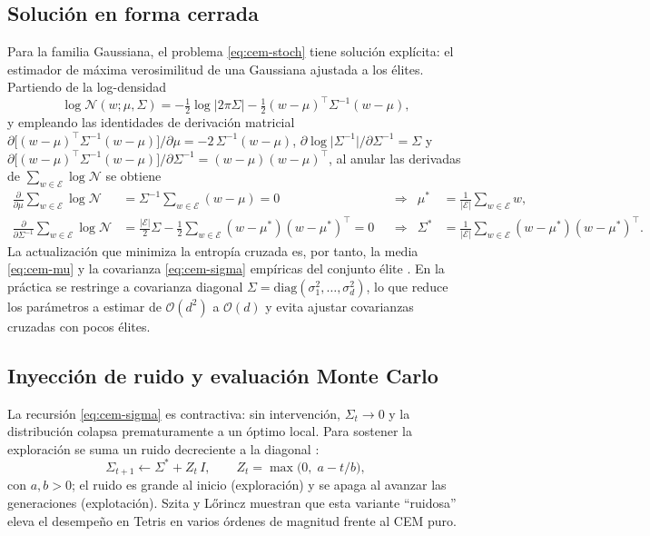 \subsection{Solución en forma cerrada}
Para la familia Gaussiana, el problema \eqref{eq:cem-stoch} tiene solución explícita:
el estimador de máxima verosimilitud de una Gaussiana ajustada a los élites. Partiendo
de la log-densidad
\begin{equation}
  \log \mathcal{N}(w; \mu, \Sigma)
  = -\tfrac{1}{2}\log\lvert 2\pi\Sigma\rvert
    - \tfrac{1}{2}(w-\mu)^{\top}\Sigma^{-1}(w-\mu),
  \label{eq:cem-loggauss}
\end{equation}
y empleando las identidades de derivación matricial
$\partial\big[(w-\mu)^{\top}\Sigma^{-1}(w-\mu)\big]/\partial \mu = -2\,\Sigma^{-1}(w-\mu)$,
$\partial \log\lvert\Sigma^{-1}\rvert/\partial \Sigma^{-1} = \Sigma$ y
$\partial\big[(w-\mu)^{\top}\Sigma^{-1}(w-\mu)\big]/\partial \Sigma^{-1} = (w-\mu)(w-\mu)^{\top}$,
al anular las derivadas de $\sum_{w \in \mathcal{E}} \log \mathcal{N}$ se obtiene
\begin{align}
  \frac{\partial}{\partial \mu} \sum_{w \in \mathcal{E}} \log \mathcal{N}
    &= \Sigma^{-1} \sum_{w \in \mathcal{E}} (w - \mu) = 0
    &&\Rightarrow&
    \mu^{*} &= \frac{1}{|\mathcal{E}|} \sum_{w \in \mathcal{E}} w,
    \label{eq:cem-mu} \\
  \frac{\partial}{\partial \Sigma^{-1}} \sum_{w \in \mathcal{E}} \log \mathcal{N}
    &= \frac{|\mathcal{E}|}{2}\Sigma
       - \frac{1}{2}\sum_{w \in \mathcal{E}}(w-\mu^{*})(w-\mu^{*})^{\top} = 0
    &&\Rightarrow&
    \Sigma^{*} &= \frac{1}{|\mathcal{E}|}
      \sum_{w \in \mathcal{E}} (w-\mu^{*})(w-\mu^{*})^{\top}.
    \label{eq:cem-sigma}
\end{align}
La actualización que minimiza la entropía cruzada es, por tanto, la media
\eqref{eq:cem-mu} y la covarianza \eqref{eq:cem-sigma} empíricas del conjunto élite
\citep{deboer2005}. En la práctica se restringe a covarianza diagonal
$\Sigma = \mathrm{diag}(\sigma_{1}^{2}, \dots, \sigma_{d}^{2})$, lo que reduce los
parámetros a estimar de $\mathcal{O}(d^{2})$ a $\mathcal{O}(d)$ y evita ajustar
covarianzas cruzadas con pocos élites.

\subsection{Inyección de ruido y evaluación Monte Carlo}
La recursión \eqref{eq:cem-sigma} es contractiva: sin intervención,
$\Sigma_{t} \to 0$ y la distribución colapsa prematuramente a un óptimo local. Para
sostener la exploración se suma un ruido decreciente a la diagonal \citep{szita2006}:
\begin{equation}
  \Sigma_{t+1} \leftarrow \Sigma^{*} + Z_{t}\, I,
  \qquad Z_{t} = \max\!\big(0,\; a - t/b\big),
  \label{eq:cem-ruido}
\end{equation}
con $a, b > 0$; el ruido es grande al inicio (exploración) y se apaga al avanzar las
generaciones (explotación). Szita y Lőrincz \citeyearpar{szita2006} muestran que esta
variante ``ruidosa'' eleva el desempeño en Tetris en varios órdenes de magnitud frente
al CEM puro.

